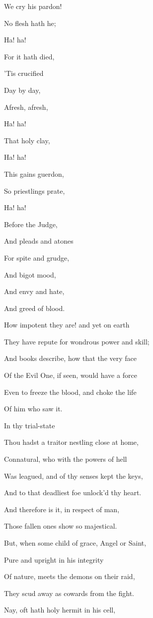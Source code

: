 We cry his pardon!

No flesh hath he;

Ha! ha!

For it hath died,

'Tis crucified

Day by day,

Afresh, afresh,

Ha! ha!

That holy clay,

Ha! ha!

This gains guerdon,

So priestlings prate,

Ha! ha!

Before the Judge,

And pleads and atones

For spite and grudge,

And bigot mood,

And envy and hate,

And greed of blood.


How impotent they are! and yet on earth

They have repute for wondrous power and skill;

And books describe, how that the very face

Of the Evil One, if seen, would have a force

Even to freeze the blood, and choke the life

Of him who saw it.


In thy trial-state

Thou hadst a traitor nestling close at home,

Connatural, who with the powers of hell

Was leagued, and of thy senses kept the keys,

And to that deadliest foe unlock'd thy heart.

And therefore is it, in respect of man,

Those fallen ones show so majestical.

But, when some child of grace, Angel or Saint,

Pure and upright in his integrity

Of nature, meets the demons on their raid,

They scud away as cowards from the fight.

Nay, oft hath holy hermit in his cell,

